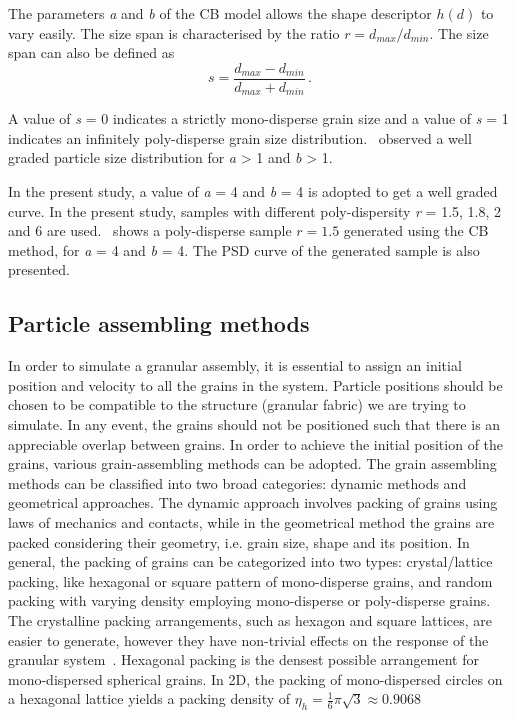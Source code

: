 The parameters \textit{a} and \textit{b} of the CB model allows the shape 
descriptor $h(d)$ to vary easily. The size span is characterised by the ratio $ 
r = d_{max}/d_{min}$. The size span can also be defined as
%
\begin{equation}
s = \frac{d_{max}-d_{min}}{d_{max}+d_{min}} \,.
\end{equation}

A value of \textit{s} = 0 indicates a strictly mono-disperse grain size and a 
value of \textit{s} = 1 indicates an infinitely poly-disperse grain size 
distribution.~\citet{Voivret2007} observed a well graded particle size 
distribution for \textit{a} > 1 and \textit{b} > 1. 

In the present study, a value of \textit{a} = 4 and \textit{b} = 4 is adopted 
to get a well graded curve. In the present study, samples with different 
poly-dispersity \textit{r} = 1.5, 1.8, 2 and 6 are used.~ 
shows a poly-disperse sample $r = 1.5$ generated using the CB method, for 
\textit{a} = 4 and \textit{b} = 4. The PSD curve of the generated 
sample is also presented.


\subsection{Particle assembling methods}
In order to simulate a granular assembly, it is essential to assign an initial 
position and velocity to all the grains in the system. Particle positions 
should be chosen to be compatible to the structure (granular fabric) we are 
trying to simulate. In any event, the grains should not be positioned such that 
there is an appreciable overlap between grains. In order to achieve the initial 
position of the grains, various grain-assembling methods can be adopted. The 
grain assembling methods can be classified into two broad categories: 
dynamic methods and geometrical approaches. The dynamic approach involves 
packing of grains using laws of mechanics and contacts, while in the 
geometrical method the grains are packed considering their geometry, 
i.e. grain size, shape and its position. In general, the packing of grains can 
be categorized into two types: crystal/lattice packing, like hexagonal or 
square pattern of mono-disperse grains, and random packing with varying density 
employing mono-disperse or poly-disperse grains. The crystalline packing 
arrangements, such as hexagon and square lattices, are easier to generate, 
however they have non-trivial effects on the response of the granular 
system~\citep{Staron2005}. Hexagonal packing is the densest possible 
arrangement for mono-dispersed spherical grains. In 2D, the packing of 
mono-dispersed circles on a hexagonal lattice yields a packing density of 
$\eta_{\mathit{h}}=\frac{1}{6}\pi\sqrt{3}\approx 0.9068$



